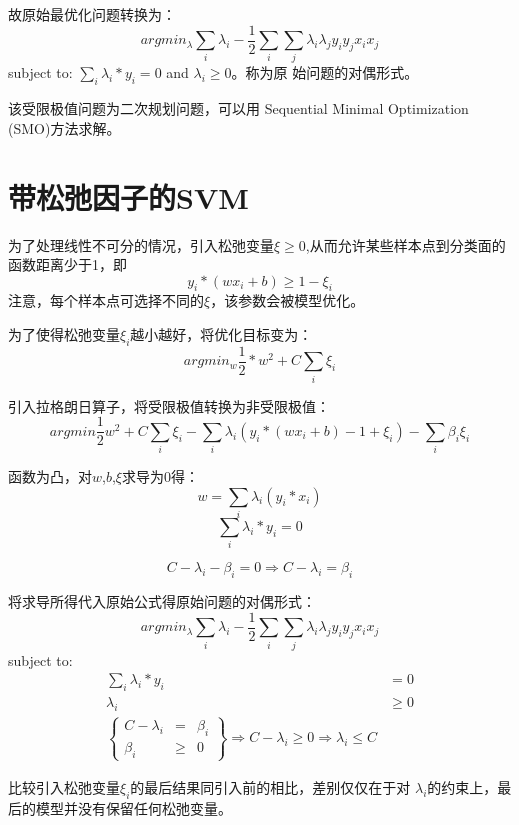 故原始最优化问题转换为：
\begin{equation}
argmin_\lambda{\sum_i{\lambda_i}-\frac{1}{2}\sum_i\sum_j{\lambda_i\lambda_jy_iy_jx_ix_j}}
\end{equation}
subject to: $ \sum_i{\lambda_i*y_i}=0$ and $\lambda_i \geq 0$。称为原
始问题的对偶形式。

该受限极值问题为二次规划问题，可以用 Sequential Minimal Optimization
(SMO)方法求解。

\section{带松弛因子的SVM}
为了处理线性不可分的情况，引入松弛变量$\xi \geq 0$,从而允许某些样本点到分类面的函数距离少于1，即
\begin{equation}
 y_i*(wx_i+b) \geq 1-\xi_i
\end{equation}
注意，每个样本点可选择不同的$\xi$，该参数会被模型优化。

为了使得松弛变量$\xi_i$越小越好，将优化目标变为：
\begin{displaymath}
argmin_w{\frac{1}{2}*w^2} + C\sum_i{\xi_i}
\end{displaymath} 

引入拉格朗日算子，将受限极值转换为非受限极值：
\begin{equation}
argmin{\frac{1}{2}w^2  + C\sum_i{\xi_i} -
\sum_i{\lambda_i(y_i*(wx_i+b)-1+\xi_i)} - \sum_i{\beta_i\xi_i}}
\end{equation} 

函数为凸，对$w$,$b$,$\xi$求导为0得：
\begin{equation}
w = \sum_i{\lambda_i(y_i*x_i)}
\end{equation} 
\begin{equation}
 \sum_i{\lambda_i*y_i}=0
\end{equation}

\begin{equation}
C-\lambda_i-\beta_i=0 \Longrightarrow
C-\lambda_i = \beta_i
\end{equation}

将求导所得代入原始公式得原始问题的对偶形式：
\begin{equation}
argmin_\lambda{\sum_i{\lambda_i}-\frac{1}{2}\sum_i\sum_j{\lambda_i\lambda_jy_iy_jx_ix_j}}
\end{equation}
subject to:
\begin{equation}
\begin{split} 
\sum_i{\lambda_i*y_i} &=0\\
\lambda_i &\geq 0 \\
\left\{
\begin{aligned}
 C-\lambda_i &=& \beta_i\\
\beta_i &\geq& 0
\end{aligned}
\right\}
\Longrightarrow
C-\lambda_i \geq 0 \Longrightarrow \lambda_i \leq C
\end{split}
\end{equation}

比较引入松弛变量$\xi_i$的最后结果同引入前的相比，差别仅仅在于对
$\lambda_i$的约束上，最后的模型并没有保留任何松弛变量。
